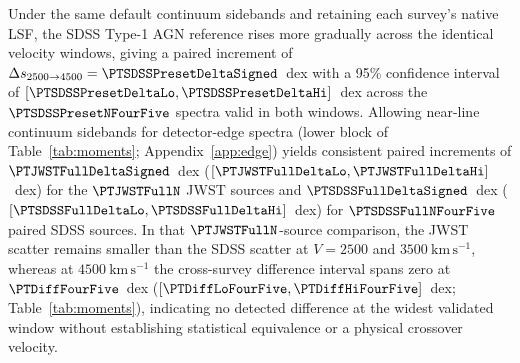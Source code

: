 \documentclass[twocolumn]{aastex631}
\newcommand{\kms}{\ensuremath{\mathrm{km\,s^{-1}}}}
\begin{document}
Under the same default continuum sidebands and retaining each survey's native LSF, the SDSS Type-1 AGN reference rises more gradually across the identical velocity windows, giving a paired increment of $\Delta s_{2500\to 4500} = \PTSDSSPresetDeltaSigned$~dex with a 95\% confidence interval of $[\PTSDSSPresetDeltaLo, \PTSDSSPresetDeltaHi]$~dex across the $\PTSDSSPresetNFourFive$ spectra valid in both windows. Allowing near-line continuum sidebands for detector-edge spectra (lower block of Table~\ref{tab:moments}; Appendix~\ref{app:edge}) yields consistent paired increments of $\PTJWSTFullDeltaSigned$~dex ($[\PTJWSTFullDeltaLo, \PTJWSTFullDeltaHi]$~dex) for the $\PTJWSTFullN$ JWST sources and $\PTSDSSFullDeltaSigned$~dex ($[\PTSDSSFullDeltaLo, \PTSDSSFullDeltaHi]$~dex) for $\PTSDSSFullNFourFive$ paired SDSS sources. In that $\PTJWSTFullN$-source comparison, the JWST scatter remains smaller than the SDSS scatter at $V = 2500$ and $3500~\kms$, whereas at $4500~\kms$ the cross-survey difference interval spans zero at $\PTDiffFourFive$~dex ($[\PTDiffLoFourFive, \PTDiffHiFourFive]$~dex; Table~\ref{tab:moments}), indicating no detected difference at the widest validated window without establishing statistical equivalence or a physical crossover velocity.
\end{document}
